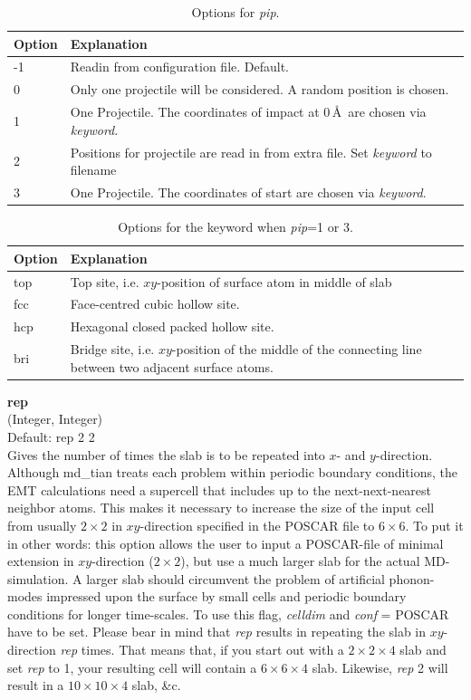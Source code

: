 \documentclass[twoside, 11pt, titlepage, captions=nooneline, a4paper, headsepline]{scrbook}%
\newcommand{\9}{\mathrm}
\newcommand{\0}{\,\mathrm}
\begin{document}
\begin{table}[t!]
\centering
\caption{Options for \emph{pip}.}
\label{Tab:mxt:pip}
\begin{tabular}{p{2cm}p{11cm}}
\hline\hline
Option&Explanation\\
\hline
-1 & Readin from configuration file. Default.\\
0 & Only one projectile will be considered. A random position is chosen. \\
1 & One Projectile. The coordinates of impact at 0\,\AA~are chosen via \emph{keyword}.\\
2 & Positions for projectile are read in from extra file. Set \emph{keyword} to filename\\
3 & One Projectile. The coordinates of start are chosen via \emph{keyword}.\\ 
\hline
\end{tabular}
\end{table}
\begin{table}[b!]
\centering
\caption{Options for the keyword when \emph{pip}=1 or 3.}
\label{Tab:mxt:pip_keyword}
\begin{tabular}{p{2cm}p{11cm}}
\hline\hline
Option&Explanation\\
\hline
top& Top site, i.e. $xy$-position of surface atom in middle of slab\\
fcc& Face-centred cubic hollow site.\\
hcp& Hexagonal closed packed hollow site.\\
bri& Bridge site, i.e. $xy$-position of the middle of the connecting line between two adjacent surface atoms.\\
\hline
\end{tabular}
\end{table}

\noindent\textbf{rep}\\ 
(Integer, Integer)\\ 
Default: rep 2 2\\
Gives the number of times the slab is to be repeated into $x$- and $y$-direction. Although md\_tian treats each problem within periodic boundary conditions, the EMT calculations need a supercell that includes up to the next-next-nearest neighbor atoms. This makes it necessary to increase the size of the input cell from usually $2\times2$ in $xy$-direction specified in the POSCAR file to $6\times6$. To put it in other words: this option allows the user to input a POSCAR-file of minimal extension in $xy$-direction ($2\times2$), but use a much larger slab for the actual MD-simulation. A larger slab should circumvent the problem of artificial phonon-modes impressed upon the surface by small cells and periodic boundary conditions for longer time-scales. To use this flag, \textit{celldim} and \textit{conf} = POSCAR have to be set. Please bear in mind that \textit{rep} results in repeating the slab in $xy$-direction \textit{rep} times. That means that, if you start out with a $2\times2\times4$ slab and set \textit{rep} to 1, your resulting cell will contain a $6\times6\times4$ slab. Likewise, \textit{rep} 2 will result in a $10\times10\times4$ slab, \&c.\\  
\end{document}
